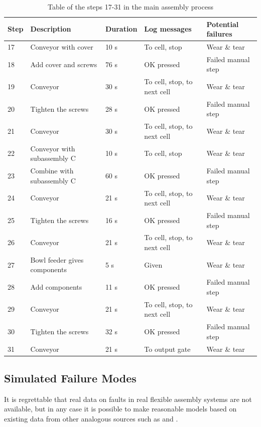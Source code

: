 \documentclass[journal]{IEEEtran}
\begin{document}
\begin{table}[!t]
\renewcommand{\arraystretch}{1.3}
\caption{Table of the steps 17-31 in the main assembly process}
\label{mainsteps2}
\centering
\begin{tabular}{|p{5mm}|p{20mm}|p{10mm}|p{15mm}|p{15mm}|}
\hline
Step & Description & Duration & Log messages & Potential failures \\
\hline
\hline
17 & Conveyor with cover & 10 s & To cell, stop & Wear \& tear \\
\hline
18 & Add cover and screws & 76 s & OK pressed & Failed manual step \\
\hline
19 & Conveyor & 30 s & To cell, stop, to next cell & Wear \& tear \\
\hline
20 & Tighten the screws & 28 s & OK pressed & Failed manual step \\
\hline
21 & Conveyor & 30 s & To cell, stop, to next cell & Wear \& tear \\
\hline
22 & Conveyor with subassembly C & 10 s & To cell, stop & Wear \& tear \\
\hline
23 & Combine with subassembly C & 60 s & OK pressed & Failed manual step \\
\hline
24 & Conveyor & 21 s & To cell, stop, to next cell & Wear \& tear \\
\hline
25 & Tighten the screws & 16 s & OK pressed & Failed manual step \\
\hline
26 & Conveyor & 21 s & To cell, stop, to next cell & Wear \& tear \\
\hline
27 & Bowl feeder gives components & 5 s & Given & Wear \& tear \\
\hline
28 & Add components & 11 s & OK pressed & Failed manual step \\
\hline
29 & Conveyor & 21 s & To cell, stop, to next cell & Wear \& tear \\
\hline
30 & Tighten the screws & 32 s & OK pressed & Failed manual step \\
\hline
31 & Conveyor & 21 s & To output gate & Wear \& tear \\
\hline
\end{tabular}
\end{table}

\subsection{Simulated Failure Modes}
It is regrettable that real data on faults in real flexible assembly systems are not available, but in any case it is possible to make reasonable
models based on existing data from other analogous sources such as \cite{nasaames} and \cite{tsarouhas2009classification}.
\end{document}
